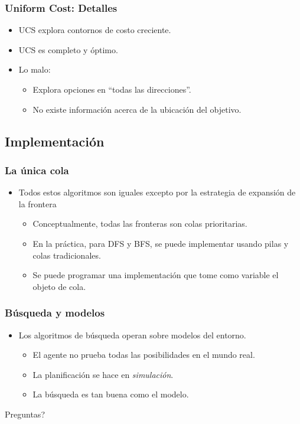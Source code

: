 \documentclass[10pt]{beamer}
\begin{document}
\begin{frame}
  \frametitle{Uniform Cost: Detalles}

  \begin{itemize}
    \item UCS explora contornos de costo creciente.
    \item UCS es completo y óptimo.
    \item Lo malo:
      \begin{itemize}
        \item Explora opciones en ``todas las direcciones''.
        \item No existe información acerca de la ubicación del objetivo.
      \end{itemize}
  \end{itemize}
  
\end{frame}

\subsection{Implementación}
\begin{frame}
  \frametitle{La única cola}

  \begin{itemize}
    \item Todos estos algoritmos son iguales excepto por la estrategia de expansión de la \alert{frontera}
      \begin{itemize}
        \item Conceptualmente, todas las fronteras son colas prioritarias.
        \item En la práctica, para DFS y BFS, se puede implementar usando pilas y colas tradicionales.
        \item Se puede programar una implementación que tome como variable el objeto de cola.
      \end{itemize}
  \end{itemize}

\end{frame}

\begin{frame}
  \frametitle{Búsqueda y modelos}

  \begin{itemize}
    \item Los algoritmos de búsqueda operan sobre modelos del entorno.
      \begin{itemize}
        \item El agente no prueba todas las posibilidades en el mundo real.
        \item La planificación se hace en \textit{simulación}.
        \item La búsqueda es tan buena como el modelo.
      \end{itemize}
  \end{itemize}

\end{frame}
{
\begin{frame}[standout]
  Preguntas?
\end{frame}
}
\end{document}
